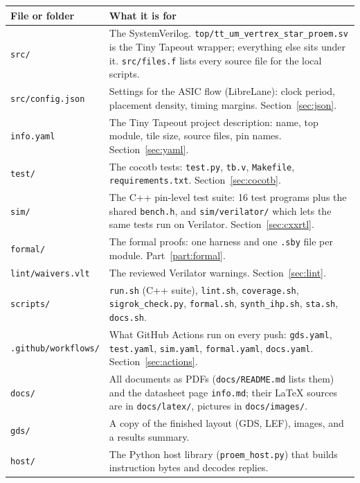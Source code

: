 \documentclass[11pt,a4paper]{article}
\newcommand{\file}[1]{\texttt{#1}}
\begin{document}
\begin{center}
\begin{tabularx}{\linewidth}{@{}lL@{}}
\toprule
File or folder & What it is for \\
\midrule
\file{src/} & The SystemVerilog. \file{top/tt\_um\_vertrex\_star\_proem.sv} is the Tiny Tapeout wrapper; everything else sits under it. \file{src/files.f} lists every source file for the local scripts. \\
\file{src/config.json} & Settings for the ASIC flow (LibreLane): clock period, placement density, timing margins. Section~\ref{sec:json}. \\
\file{info.yaml} & The Tiny Tapeout project description: name, top module, tile size, source files, pin names. Section~\ref{sec:yaml}. \\
\file{test/} & The cocotb tests: \file{test.py}, \file{tb.v}, \file{Makefile}, \file{requirements.txt}. Section~\ref{sec:cocotb}. \\
\file{sim/} & The C++ pin-level test suite: 16 test programs plus the shared \file{bench.h}, and \file{sim/verilator/} which lets the same tests run on Verilator. Section~\ref{sec:cxxrtl}. \\
\file{formal/} & The formal proofs: one harness and one \file{.sby} file per module. Part~\ref{part:formal}. \\
\file{lint/waivers.vlt} & The reviewed Verilator warnings. Section~\ref{sec:lint}. \\
\file{scripts/} & \file{run.sh} (C++ suite), \file{lint.sh}, \file{coverage.sh}, \file{sigrok\_check.py}, \file{formal.sh}, \file{synth\_ihp.sh}, \file{sta.sh}, \file{docs.sh}. \\
\file{.github/workflows/} & What GitHub Actions run on every push: \file{gds.yaml}, \file{test.yaml}, \file{sim.yaml}, \file{formal.yaml}, \file{docs.yaml}. Section~\ref{sec:actions}. \\
\file{docs/} & All documents as PDFs (\file{docs/README.md} lists them) and the datasheet page \file{info.md}; their LaTeX sources are in \file{docs/latex/}, pictures in \file{docs/images/}. \\
\file{gds/} & A copy of the finished layout (GDS, LEF), images, and a results summary. \\
\file{host/} & The Python host library (\file{proem\_host.py}) that builds instruction bytes and decodes replies. \\
\bottomrule
\end{tabularx}
\end{center}
\end{document}
